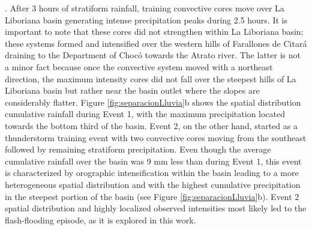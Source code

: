 \documentclass[hess, manuscript]{copernicus} %
\providecommand{\DIFaddend}{} %
\begin{document}
{.  After 3 hours of stratiform rainfall, training convective cores move over La Liboriana basin generating intense precipitation peaks during 2.5 hours. It is important to note that these cores did not strengthen within La Liboriana basin; these systems formed and intensified over the western hills of Farallones de Citará draining to the Department of Chocó towards the Atrato river. The latter is not a minor fact because once the convective system moved with a northeast direction, the maximum intensity cores did not fall over the steepest hills of La Liboriana basin but rather near the basin outlet where the slopes are considerably flatter. Figure \ref{fig:separacionLluvia}b shows the spatial distribution cumulative rainfall during Event 1, with the maximum precipitation located towards the bottom third of the basin. Event 2, on the other hand, started as a thunderstorm training event with two convective cores moving from the southeast followed by remaining stratiform precipitation.  Even though the average cumulative rainfall over the basin was 9 mm less than during Event 1, this event is characterized by orographic intensification within the basin leading to a more heterogeneous spatial distribution and with the highest cumulative precipitation in the steepest portion of the basin (see Figure \ref{fig:separacionLluvia}b). Event 2 spatial distribution and highly localized observed intensities most likely led to the flash-flooding episode, as it is explored in this work}\DIFaddend . \\
\end{document}
